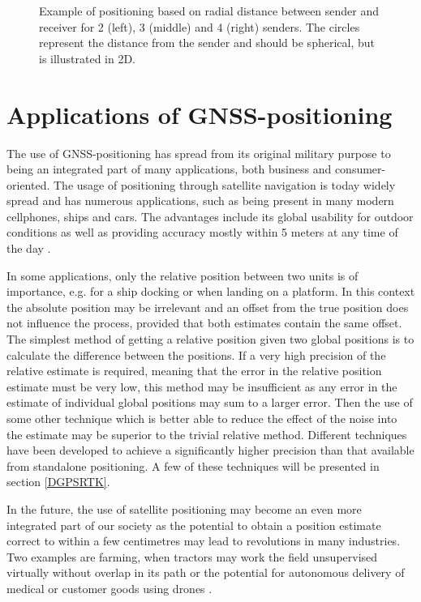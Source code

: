 \begin{figure}[h!]
\begin{minipage}[t]{0.3\textwidth}
\end{minipage}
\caption{\label{fig:Trilateration} Example of positioning based on radial distance between sender and receiver for 2 (left), 3 (middle) and 4 (right) senders. The circles represent the distance from the sender and should be spherical, but is illustrated in 2D.}
\end{figure}

\section{Applications of GNSS-positioning}
The use of GNSS-positioning has spread from its original military purpose to being an integrated part of many applications, both business and consumer-oriented. The usage of positioning through satellite navigation is today widely spread and has numerous applications, such as being present in many modern cellphones, ships and cars. The advantages include its global usability for outdoor conditions as well as providing accuracy mostly within 5 meters at any time of the day \cite{posAccuracy}.
\par
In some applications, only the relative position between two units is of importance, e.g. for a ship docking or when landing on a platform. In this context the absolute position may be irrelevant and an offset from the true position does not influence the process, provided that both estimates contain the same offset. The simplest method of getting a relative position given two global positions is to calculate the difference between the positions. If a very high precision of the relative estimate is required, meaning that the error in the relative position estimate must be very low, this method may be insufficient as any error in the estimate of individual global positions may sum to a larger error. Then the use of some other technique which is better able to reduce the effect of the noise into the estimate may be superior to the trivial relative method. Different techniques have been developed to achieve a significantly higher precision than that available from standalone positioning. A few of these techniques  will be presented in section \ref{DGPSRTK}. 
\par
In the future, the use of satellite positioning may become an even more integrated part of our society as the potential to obtain a position estimate correct to within a few centimetres may lead to revolutions in many industries. Two examples are farming, when tractors may work the field unsupervised virtually without overlap in its path \cite{garcianoglobal} or the potential for autonomous delivery of medical or customer goods using drones \cite{Patrik2019}. 


